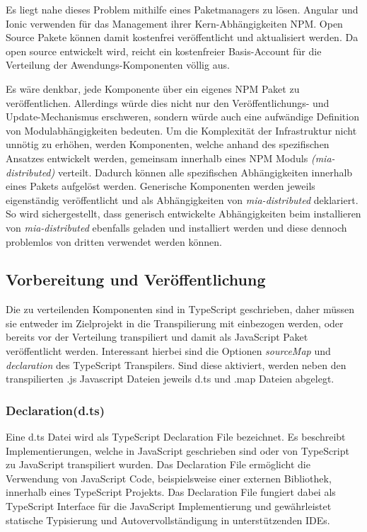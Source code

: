 Es liegt nahe dieses Problem mithilfe eines Paketmanagers zu lösen. Angular und Ionic verwenden für das Management
ihrer Kern-Abhängigkeiten \ac{NPM}.
Open Source Pakete können damit kostenfrei veröffentlicht und aktualisiert werden.
Da \projectname{} open source entwickelt wird,
reicht ein kostenfreier Basis-Account für die Verteilung der Awendungs-Komponenten völlig aus.

Es wäre denkbar, jede Komponente über ein eigenes \ac{NPM} Paket zu veröffentlichen.
Allerdings würde dies nicht nur den Veröffentlichungs- und Update-Mechanismus erschweren,
sondern würde auch eine aufwändige Definition von Modulabhängigkeiten bedeuten.
Um die Komplexität der Infrastruktur nicht unnötig zu erhöhen,
werden Komponenten, welche anhand des spezifischen Ansatzes entwickelt werden,
gemeinsam innerhalb eines \ac{NPM} Moduls \emph{(mia-distributed)} verteilt.
Dadurch können alle spezifischen Abhängigkeiten innerhalb eines Pakets aufgelöst werden.
Generische Komponenten werden jeweils eigenständig veröffentlicht und als Abhängigkeiten von \emph {mia-distributed} deklariert.
So wird sichergestellt, dass generisch entwickelte Abhängigkeiten beim installieren von \emph{mia-distributed}
ebenfalls geladen und installiert werden und diese dennoch problemlos von dritten verwendet werden können.

\subsection{Vorbereitung und Veröffentlichung}

Die zu verteilenden Komponenten sind in TypeScript geschrieben,
daher müssen sie entweder im Zielprojekt in die Transpilierung mit einbezogen werden,
oder bereits vor der Verteilung transpiliert und damit als JavaScript Paket veröffentlicht werden.
Interessant hierbei sind die Optionen \emph{sourceMap} und \emph{declaration} des TypeScript Transpilers.
Sind diese aktiviert, werden neben den transpilierten .js Javascript Dateien jeweils d.ts und .map Dateien abgelegt.

\subsubsection{Declaration(d.ts)}

Eine d.ts Datei wird als TypeScript Declaration File bezeichnet.
Es beschreibt Implementierungen, welche in JavaScript geschrieben sind oder von TypeScript zu JavaScript transpiliert wurden.
Das Declaration File ermöglicht die Verwendung von JavaScript Code, beispielsweise einer externen Bibliothek,
innerhalb eines TypeScript Projekts. Das Declaration File fungiert dabei als TypeScript Interface
für die JavaScript Implementierung und gewährleistet statische Typisierung
und Autovervollständigung in unterstützenden IDEs.

